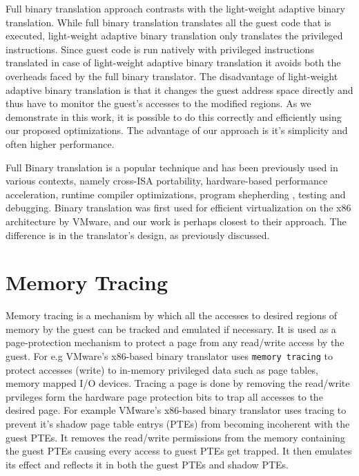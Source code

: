 Full binary translation approach contrasts with the light-weight adaptive binary translation. While full binary translation translates all the guest code that is executed, light-weight adaptive binary translation only translates the privileged instructions. Since guest code is run natively with privileged instructions translated in case of light-weight adaptive binary translation it avoids both the overheads faced by the full binary translator. The disadvantage of light-weight adaptive binary translation is that it changes the guest address space directly and thus have to monitor the guest's accesses to the modified regions. As we demonstrate in this work, it is possible to do this correctly and efficiently using our proposed optimizations. The advantage of our approach is it’s simplicity and often higher performance.

Full Binary translation is a popular technique and has been previously used in various contexts, namely cross-ISA portability\cite{bansal:osdi08, qemu:software}, hardware-based performance acceleration\cite{transmeta_crusoe:chip}, runtime compiler optimizations\cite{bala00dynamo}, program shepherding \cite{bruening04thesis}, testing and debugging\cite{valgrind}. Binary translation was first used for efficient virtualization on the x86 architecture by VMware\cite{adams:asplos06}, and our work is perhaps closest to their approach. The difference is in the translator's design, as previously discussed.

\section{Memory Tracing}
\label{memory_tracing}
Memory tracing is a mechanism by which all the accesses to desired regions of memory by the guest can be tracked and emulated if necessary. It is used as a page-protection mechanism to protect a page from any read/write access by the guest. For e.g VMware’s x86-based binary translator\cite{adams:asplos06} uses {\tt memory tracing} to protect accesses (write) to in-memory privileged data such as page tables, memory mapped I/O devices. Tracing a page is done by removing the read/write prvileges form the hardware page protection bits to trap all accesses to the desired page. For example VMware’s x86-based binary translator uses tracing to prevent it's shadow page table entrys (PTEs) from becoming incoherent with the guest PTEs. It removes the read/write permissions from the memory containing the guest PTEs causing every access to guest PTEs get trapped. It then emulates its effect and reflects it in both the guest PTEs and shadow PTEs.



